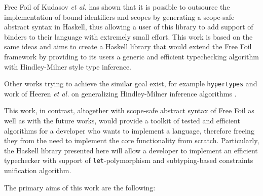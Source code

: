 Free Foil of Kudasov \textit{et al.} \cite{FreeFoil} has shown that it is possible to outsource the implementation of bound identifiers and scopes by generating a scope-safe abstract syntax in Haskell, thus allowing a user of this library to add support of binders to their language with extremely small effort.
This work is based on the same ideas and aims to create a Haskell library that would extend the Free Foil framework by providing to its users a generic and efficient typechecking algorithm with Hindley-Milner style type inference.


Other works trying to achieve the similar goal exist, for example \texttt{hypertypes} \cite{hypertypes} and work of Heeren \textit{et al.} on generalizing Hindley-Milner inference algorithms \cite{Heeren2002GeneralizingHindleyMilner}.

This work, in contrast, altogether with scope-safe abstract syntax of Free Foil as well as with the future works, would provide a toolkit of tested and efficient algorithms for a developer who wants to implement a language, therefore freeing they from the need to implement the core functionality from scratch.
Particularly, the Haskell library presented here will allow a developer to implement an efficient typechecker with support of \texttt{let}-polymorphism and subtyping-based constraints unification algorithm.


The primary aims of this work are the following:

